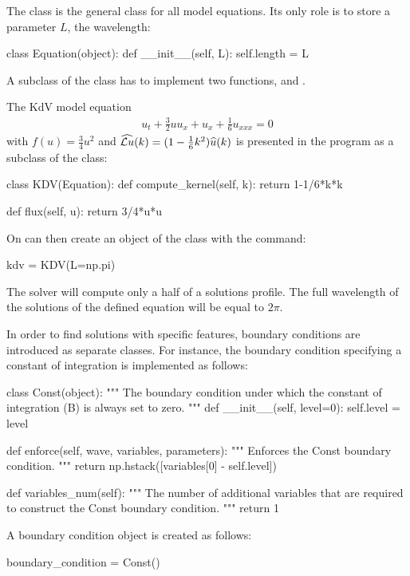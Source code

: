  The  class is the general class for all model equations. 
Its only role is to store a parameter $L$, the wavelength:

\begin{python}
class Equation(object):
    def __init__(self, L):
        self.length = L
\end{python}
A subclass of the  class has to implement two functions,  and . 

The KdV model equation
\begin{align}
	u_t + \frac{3}{2} u u_x + u_x + \frac{1}{6} u_{xxx} = 0
\end{align}
with $f(u) = \frac{3}{4} u^2$ and $\widehat{\mathcal{L} u}(k) = (1 - \frac{1}{6} k^2)\widehat{u}(k)$ is presented in the program as a subclass of the  class:
\begin{python}
class KDV(Equation):
    def compute_kernel(self, k):
        return 1-1/6*k*k

    def flux(self, u):
        return 3/4*u*u  
\end{python} 

 
 
 
On can then create an object of the class  with the command:
\begin{python}
kdv = KDV(L=np.pi)
\end{python} 
%
The solver will compute only a half of a solutions profile. The full wavelength of the solutions 
of the defined equation will be equal to $2\pi$. 

In order to find solutions with specific features, boundary conditions are introduced as separate classes.
For instance, the boundary condition specifying a constant of integration is implemented as follows:
\begin{python}
class Const(object):
""" The boundary condition under which the constant of integration 
(B) is always set to zero. """
    def __init__(self, level=0):
        self.level = level

    def enforce(self, wave, variables, parameters):
    """ Enforces the Const boundary condition. """
        return np.hstack([variables[0] - self.level])

    def variables_num(self):
    """ The number of additional variables that are required to construct 
    the Const boundary condition. """
        return 1
\end{python}
A  boundary condition object is created as follows:
\begin{python}
boundary_condition = Const()
\end{python}

